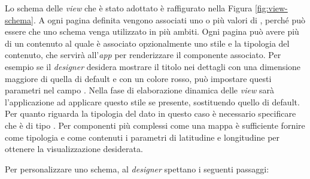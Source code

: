 Lo schema delle \emph{view} che è stato adottato è raffigurato nella Figura \ref{fig:view-schema}. A ogni pagina definita vengono associati uno o più valori di , perché può essere che uno schema venga utilizzato in più ambiti. Ogni pagina può avere più di un contenuto al quale è associato opzionalmente uno stile e la tipologia del contenuto, che servirà all'\emph{app} per renderizzare il componente associato. Per esempio se il \emph{designer} desidera mostrare il titolo nei dettagli con una dimensione maggiore di quella di default e con un colore rosso, può impostare questi parametri nel campo . Nella fase di elaborazione dinamica delle \emph{view} sarà l'applicazione ad applicare questo stile se presente, sostituendo quello di default. Per quanto riguarda la tipologia del dato  in questo caso è necessario specificare che è di tipo . Per componenti più complessi come una mappa è sufficiente fornire come tipologia  e come contenuti i parametri di latitudine e longitudine per ottenere la visualizzazione desiderata.

Per personalizzare uno schema, al \emph{designer} spettano i seguenti passaggi:

